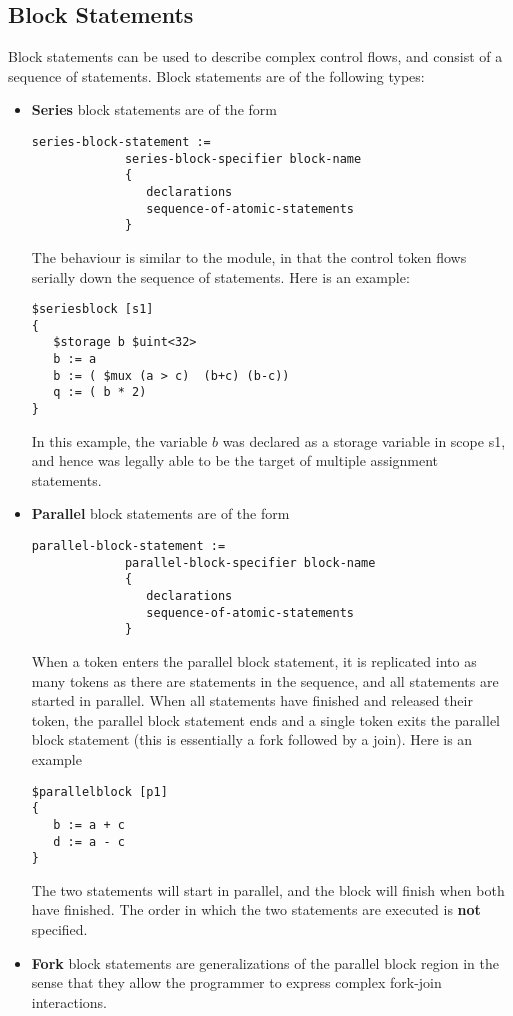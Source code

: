 \documentclass{article}
\begin{document}
\subsection{Block Statements}

Block statements can be used to describe complex
control flows, and consist of a sequence of statements.
Block statements are of
the following types:
\begin{itemize}
\item {\bf Series} block statements are of the form
\begin{verbatim}
series-block-statement :=
             series-block-specifier block-name
             { 
                declarations
                sequence-of-atomic-statements
             }
\end{verbatim}
The behaviour is similar to the module, in that the control
token flows serially down the sequence of statements.
Here is an example:
\begin{verbatim}
$seriesblock [s1] 
{
   $storage b $uint<32>
   b := a
   b := ( $mux (a > c)  (b+c) (b-c))
   q := ( b * 2)
}
\end{verbatim}
In this example, the variable $b$ was declared as
a storage variable in scope s1, and hence was legally
able to be the target of multiple assignment statements.
\item {\bf Parallel} block statements are of the form
\begin{verbatim}
parallel-block-statement :=
             parallel-block-specifier block-name
             { 
                declarations
                sequence-of-atomic-statements
             }
\end{verbatim}
When a token enters the parallel block statement, it
is replicated into as many tokens as there are statements in
the sequence, and all statements are started in parallel.
When all statements have finished and released their token,
the parallel block statement
ends and a single token exits the parallel block statement (this
is essentially a fork followed by a join).
Here is an example
\begin{verbatim}
$parallelblock [p1] 
{
   b := a + c
   d := a - c
}
\end{verbatim}
The two statements will start in parallel, and the block 
will finish when both have finished.  The
order in which the two statements are executed
is {\bf not} specified.
\item {\bf Fork} block statements are generalizations of the
parallel block region in the sense that they
allow the programmer to express complex fork-join interactions.

\end{itemize}
\end{document}
